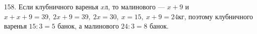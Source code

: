 158. Если клубничного варенья $x$л, то малинового --- $x+9$ и $x+x+9=39,\ 2x+9=39,\ 2x=30,\ x=15,\ x+9=24$кг, поэтому клубничного варенья $15:3=5$ банок, а малинового $24:3=8$ банок.\\
